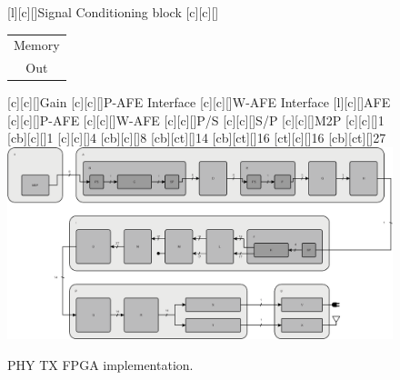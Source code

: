 \documentclass[mathserif]{beamer}
\begin{document}
\begin{frame}
\begin{figure}[h]
		[\sizeLetter]{Signal Conditioning block}
		[\sizeLetter]{\begin{tabular}{c}
				Memory\\Out
		\end{tabular}}
		[\sizeLetter]{Gain}
		[\sizeLetter]{P-AFE Interface}
		[\sizeLetter]{W-AFE Interface}
		[\sizeLetter]{AFE}
		[\sizeLetter]{P-AFE}
		[\sizeLetter]{W-AFE}
		[\sizeLetter]{P/S}
		[\sizeLetter]{S/P}
		[\sizeLetter]{M2P}	
		[\sizeLetter]{1}	
		[cb][c][\sizeLetter]{1}
		[\sizeLetter]{4}
		[cb][c][\sizeLetter]{8}
		[cb][ct][\sizeLetter]{14}
		[cb][ct][\sizeLetter]{16}
		[ct][c][\sizeLetter]{16}
		[cb][ct][\sizeLetter]{27}
		\includegraphics[width=0.9\linewidth]{figuras/phy_tx}
		\caption{PHY TX FPGA implementation.}
		\label{fig:phytx}
	\end{figure}
\end{frame}
\end{document}
